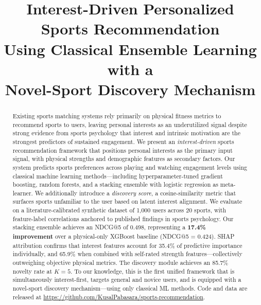 \documentclass[conference]{IEEEtran}
\begin{document}
\title{Interest-Driven Personalized Sports Recommendation\\
Using Classical Ensemble Learning with a\\
Novel-Sport Discovery Mechanism}

\author{
}

\maketitle

\begin{abstract}
Existing sports matching systems rely primarily on physical fitness metrics
to recommend sports to users, leaving personal interests as an underutilized
signal despite strong evidence from sports psychology that interest and
intrinsic motivation are the strongest predictors of sustained engagement.
We present an \textit{interest-driven} sports recommendation framework
that positions personal interests as the primary input signal, with physical
strengths and demographic features as secondary factors.
Our system predicts sports preferences across playing and watching
engagement levels using classical machine learning methods---including
hyperparameter-tuned gradient boosting, random forests, and a stacking
ensemble with logistic regression as meta-learner.
We additionally introduce a \textit{discovery score}, a cosine-similarity
metric that surfaces sports unfamiliar to the user based on latent interest
alignment.
We evaluate on a literature-calibrated synthetic dataset of 1{,}000 users
across 20 sports, with feature-label correlations anchored to published
findings in sports psychology.
Our stacking ensemble achieves an NDCG@5 of 0.498, representing a
\textbf{17.4\% improvement} over a physical-only XGBoost baseline (NDCG@5 = 0.424).
SHAP attribution confirms that interest features account for 35.4\% of
predictive importance individually, and 65.9\% when combined with
self-rated strength features---collectively outweighing objective physical
metrics.
The discovery module achieves an 85.7\% novelty rate at $K{=}5$.
To our knowledge, this is the first unified framework that is simultaneously
interest-first, targets general and novice users, and is equipped with a
novel-sport discovery mechanism---using only classical ML methods.
Code and data are released at \url{https://github.com/KusalPabasara/sports-recommendation}.
\end{abstract}
\end{document}

